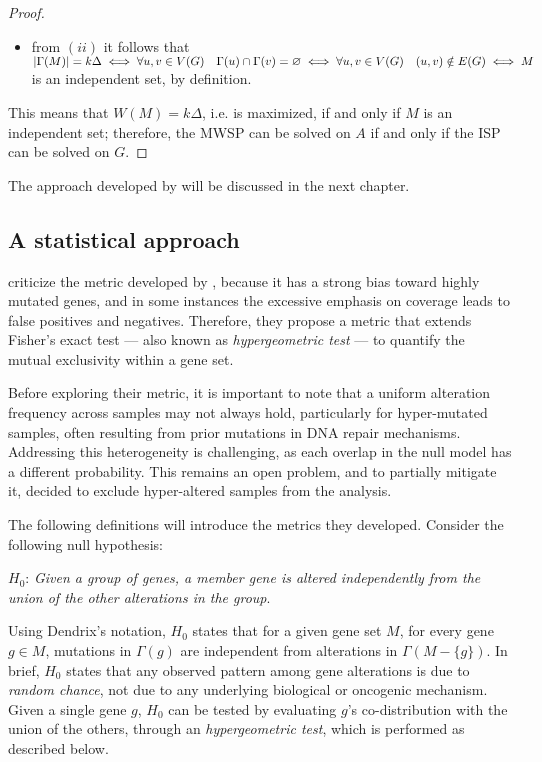 \begin{proof}
\begin{itemize}
        \item from $(ii)$ it follows that $\left|\Gamma(M)\right| = k \Delta \iff \forall u, v \in V(G) \quad \Gamma(u) \cap \Gamma(v) = \varnothing \iff \forall u, v \in V(G) \quad (u, v) \notin E(G) \iff M$ is an independent set, by definition.
    \end{itemize}

    This means that $W(M) = k \Delta$, i.e. is maximized, if and only if $M$ is an independent set; therefore, the MWSP can be solved on $A$ if and only if the ISP can be solved on $G$.
\end{proof}

The approach developed by \textcite{dendrix} will be discussed in the next chapter.

\subsection{A statistical approach}

\textcite{mutex} criticize the metric developed by \textcite{dendrix}, because it has a strong bias toward highly mutated genes, and in some instances the excessive emphasis on coverage leads to false positives and negatives. Therefore, they propose a metric that extends Fisher's exact test --- also known as \textit{hypergeometric test} --- to quantify the mutual exclusivity within a gene set.

Before exploring their metric, it is important to note that a uniform alteration frequency across samples may not always hold, particularly for hyper-mutated samples, often resulting from prior mutations in DNA repair mechanisms. Addressing this heterogeneity is challenging, as each overlap in the null model has a different probability. This remains an open problem, and to partially mitigate it, \textcite{mutex} decided to exclude hyper-altered samples from the analysis.

The following definitions will introduce the metrics they developed. Consider the following null hypothesis:

\begin{displayquote} \label{H_0}
    $H_0$: \textit{Given a group of genes, a member gene is altered independently from the union of the other alterations in the group}.
\end{displayquote}

Using Dendrix's notation, $H_0$ states that for a given gene set $M$, for every gene $g \in M$, mutations in $\Gamma(g)$ are independent from alterations in $\Gamma(M - \{g\})$. In brief, $H_0$ states that any observed pattern among gene alterations is due to \textit{random chance}, not due to any underlying biological or oncogenic mechanism. Given a single gene $g$, $H_0$ can be tested by evaluating $g$'s co-distribution with the union of the others, through an \textit{hypergeometric test}, which is performed as described below.

